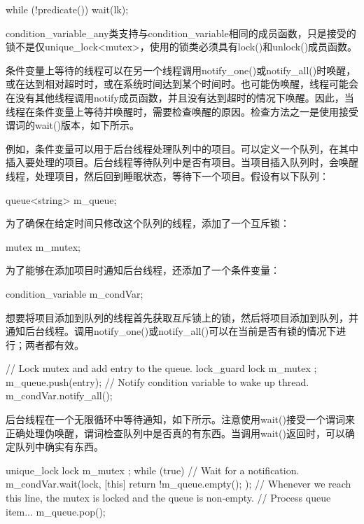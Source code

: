 \begin{cpp}
while (!predicate())
    wait(lk);
\end{cpp}

condition\_variable\_any类支持与condition\_variable相同的成员函数，只是接受的锁不是仅unique\_lock<mutex>，使用的锁类必须具有lock()和unlock()成员函数。


条件变量上等待的线程可以在另一个线程调用notify\_one()或notify\_all()时唤醒，或在达到相对超时时，或在系统时间达到某个时间时。也可能伪唤醒，线程可能会在没有其他线程调用notify成员函数，并且没有达到超时的情况下唤醒。因此，当线程在条件变量上等待并唤醒时，需要检查唤醒的原因。检查方法之一是使用接受谓词的wait()版本，如下所示。


例如，条件变量可以用于后台线程处理队列中的项目。可以定义一个队列，在其中插入要处理的项目。后台线程等待队列中是否有项目。当项目插入队列时，会唤醒线程，处理项目，然后回到睡眠状态，等待下一个项目。假设有以下队列：

\begin{cpp}
queue<string> m_queue;
\end{cpp}

为了确保在给定时间只修改这个队列的线程，添加了一个互斥锁：

\begin{cpp}
mutex m_mutex;
\end{cpp}

为了能够在添加项目时通知后台线程，还添加了一个条件变量：

\begin{cpp}
condition_variable m_condVar;
\end{cpp}

想要将项目添加到队列的线程首先获取互斥锁上的锁，然后将项目添加到队列，并通知后台线程。调用notify\_one()或notify\_all()可以在当前是否有锁的情况下进行；两者都有效。

\begin{cpp}
// Lock mutex and add entry to the queue.
lock_guard lock { m_mutex };
m_queue.push(entry);
// Notify condition variable to wake up thread.
m_condVar.notify_all();
\end{cpp}

后台线程在一个无限循环中等待通知，如下所示。注意使用wait()接受一个谓词来正确处理伪唤醒，谓词检查队列中是否真的有东西。当调用wait()返回时，可以确定队列中确实有东西。

\begin{cpp}
unique_lock lock { m_mutex };
while (true) {
    // Wait for a notification.
    m_condVar.wait(lock, [this]{ return !m_queue.empty(); });
    // Whenever we reach this line, the mutex is locked and the queue is non-empty.
    // Process queue item...
    m_queue.pop();
}
\end{cpp}

